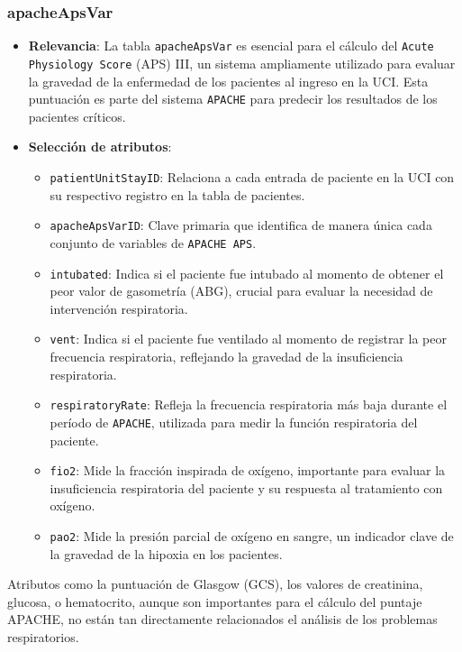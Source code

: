 \documentclass[12pt, a4paper, twoside]{article}
\begin{document}
	\subsubsection{apacheApsVar}
	
	\begin{itemize}
		\item \textbf{Relevancia}: La tabla \texttt{apacheApsVar} es esencial para el cálculo del \texttt{Acute Physiology Score} (APS) III, un sistema ampliamente utilizado para evaluar la gravedad de la enfermedad de los pacientes al ingreso en la UCI. Esta puntuación es parte del sistema \texttt{APACHE} para predecir los resultados de los pacientes críticos.
		
		\item \textbf{Selección de atributos}:
		\begin{itemize}
			\item \texttt{patientUnitStayID}: Relaciona a cada entrada de paciente en la UCI con su respectivo registro en la tabla de pacientes.
			\item \texttt{apacheApsVarID}: Clave primaria que identifica de manera única cada conjunto de variables de \texttt{APACHE APS}.
			\item \texttt{intubated}: Indica si el paciente fue intubado al momento de obtener el peor valor de gasometría (ABG), crucial para evaluar la necesidad de intervención respiratoria.
			\item \texttt{vent}: Indica si el paciente fue ventilado al momento de registrar la peor frecuencia respiratoria, reflejando la gravedad de la insuficiencia respiratoria.
			\item \texttt{respiratoryRate}: Refleja la frecuencia respiratoria más baja durante el período de \texttt{APACHE}, utilizada para medir la función respiratoria del paciente.
			\item \texttt{fio2}: Mide la fracción inspirada de oxígeno, importante para evaluar la insuficiencia respiratoria del paciente y su respuesta al tratamiento con oxígeno.
			\item \texttt{pao2}: Mide la presión parcial de oxígeno en sangre, un indicador clave de la gravedad de la hipoxia en los pacientes.
		\end{itemize}
		
	\end{itemize}
	
	Atributos como la puntuación de Glasgow (GCS), los valores de creatinina, glucosa, o hematocrito, aunque son importantes para el cálculo del puntaje APACHE, no están tan directamente relacionados el análisis de los problemas respiratorios.  \cite{eICU2024}
	
\end{document}
